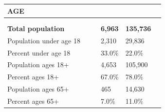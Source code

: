 \documentclass[9pt]{report}
\begin{document}
\vspace{24pt}
\setlength{\tabcolsep}{.01in} %
\begin{tabular}{p{.10in}p{.10in}p{.10in}p{3.7in}>{\hfill}p{.85in}>{\hfill}p{.85in}>{\hfill}p{.85in}>{\hfill}p{.85in}p{0.1in}}
\multicolumn{9}{l}{\parbox{7.1in}{\raggedright{\large{\strut\textbf{AGE}\strut}}}} \\ 
\hline
\multicolumn{4}{l}{\parbox{3.5in}{\raggedright{\textbf{}}}} & \multicolumn{1}{r}{\parbox{.85in}{\strut\raggedleft{\textbf{}\strut}}} & \multicolumn{1}{r}{\parbox{.85in}{\strut\raggedleft{\textbf{}\strut}}} & \multicolumn{1}{r}{\parbox{.85in}{\strut{}}} & \multicolumn{1}{r}{\parbox{.85in}{\strut{}}} & \\ 
\multicolumn{9}{l}{} \\ 
\multicolumn{4}{l}{\parbox{3.5in}{\strut\raggedright{\textbf{Total population}\strut}}} & \textbf{} & \textbf{} & \textbf{6,963} & \textbf{135,736} & \textbf{} \\ 
\multicolumn{4}{l}{\parbox{3.6in}{\strut\raggedright{{Population under age 18}}\strut}} &  &  & 2,310 & 29,836 & \multicolumn{1}{l}{}  \\ 
\multicolumn{4}{l}{\parbox{3.6in}{\strut\raggedright{{Percent under age 18}}\strut}} &  &  & 33.0\% & 22.0\% & \multicolumn{1}{l}{}  \\ 
\multicolumn{4}{l}{\parbox{3.6in}{\strut\raggedright{{Population ages 18+}}\strut}} &  &  & 4,653 & 105,900 & \multicolumn{1}{l}{}  \\ 
\multicolumn{4}{l}{\parbox{3.6in}{\strut\raggedright{{Percent ages 18+}}\strut}} &  &  & 67.0\% & 78.0\% & \multicolumn{1}{l}{}  \\ 
\multicolumn{4}{l}{\parbox{3.6in}{\strut\raggedright{{Population ages 65+}}\strut}} &  &  & 465 & 14,630 & \multicolumn{1}{l}{}  \\ 
\multicolumn{4}{l}{\parbox{3.6in}{\strut\raggedright{{Percent ages 65+}}\strut}} &  &  & 7.0\% & 11.0\% & \multicolumn{1}{l}{}  \\ 

\end{tabular}
\setlength{\tabcolsep}{6pt} %
\end{document}
